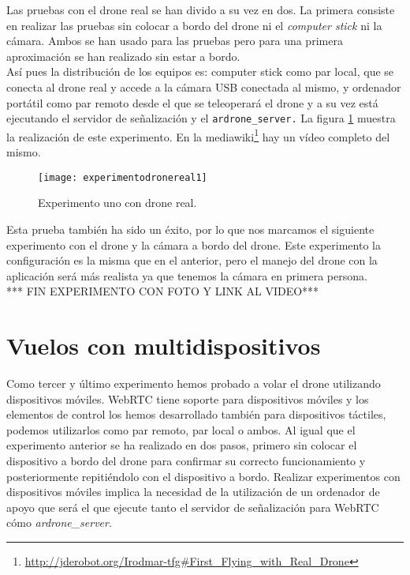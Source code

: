 Las pruebas con el drone real se han divido a su vez en dos. La primera consiste en realizar las pruebas sin colocar a bordo del drone ni el \emph{computer stick} ni la cámara. Ambos se han usado para las pruebas pero para una primera aproximación se han realizado sin estar a bordo.\\

Así pues la distribución de los equipos es: computer stick como par local, que se conecta al drone real y accede a la cámara USB conectada al mismo, y ordenador portátil como par remoto desde el que se teleoperará el drone y a su vez está ejecutando el servidor de señalización y el \texttt{ardrone\_server.} La figura \ref{fig:experimentodronereal1} muestra la realización de este experimento. En la mediawiki\footnote{\url{http://jderobot.org/Irodmar-tfg\#First\_Flying\_with\_Real\_Drone}}\cite{Mediawiki} hay un vídeo completo del mismo.\\

\begin{figure}[h!]
\centering
\texttt{[image: experimentodronereal1]}
\caption{Experimento uno con drone real.}
\label{fig:experimentodronereal1}
\end{figure}

Esta prueba también ha sido un éxito, por lo que nos marcamos el siguiente experimento con el drone y la cámara a bordo del drone. Este experimento la configuración es la misma que en el anterior, pero el manejo del drone con la aplicación será más realista ya que tenemos la cámara en primera persona.\\

*** FIN EXPERIMENTO CON FOTO Y LINK AL VIDEO***


\section{Vuelos con multidispositivos}

Como tercer y último experimento hemos probado a volar el drone utilizando dispositivos móviles. WebRTC tiene soporte para dispositivos móviles y los elementos de control los hemos desarrollado también para dispositivos táctiles, podemos utilizarlos como par remoto, par local o ambos. Al igual que el experimento anterior se ha realizado en dos pasos, primero sin colocar el dispositivo a bordo del drone para confirmar su correcto funcionamiento y posteriormente repitiéndolo con el dispositivo a bordo. Realizar experimentos con dispositivos móviles implica la necesidad de la utilización de un ordenador de apoyo que será el que ejecute tanto el servidor de señalización para WebRTC cómo \emph{ardrone\_server}.\\

